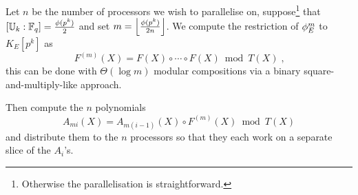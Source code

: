 Let $n$ be the number of processors we wish to parallelise on,
suppose\footnote{Otherwise the parallelisation is straightforward.}
that $[\mathbb{U}_k:\mathbb{F}_q] = \frac{\phi(p^k)}{2}$ and set
$m=\left\lfloor\frac{\phi(p^k)}{2n}\right\rfloor$. We compute the
restriction of $\phi_E^{m}$ to $K_E[p^k]$ as
\begin{equation*}
  F^{(m)}(X) = F(X) \circ \cdots \circ F(X) \bmod T(X)
  \;\text{,}
\end{equation*}
this can be done with $\Theta(\log m)$ modular compositions via a
binary square-and-multiply-like approach.

Then compute the $n$ polynomials
\begin{equation*}
  A_{mi}(X) = A_{m(i-1)}(X) \circ F^{(m)}(X) \bmod T(X)
\end{equation*}
and distribute them to the $n$ processors so that they each work on a
separate slice of the $A_i$'s.



%
